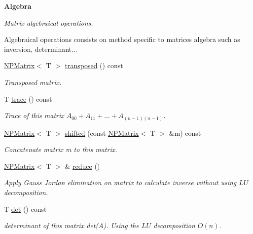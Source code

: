 \begin{Indent}\textbf{ Algebra}\par
{\em Matrix algebraical operations.

Algebraical operations consists on method specific to matrices algebra such as inversion, determinant... }\begin{DoxyCompactItemize}
\item 
\mbox{\hyperlink{class_n_p_matrix}{N\+P\+Matrix}}$<$ T $>$ \mbox{\hyperlink{class_n_p_matrix_abb4f410d97dc7e89798c67112c1e1bd3}{transposed}} () const
\begin{DoxyCompactList}\small\item\em Transposed matrix. \end{DoxyCompactList}\item 
T \mbox{\hyperlink{class_n_p_matrix_a007a87743223b6dddaa3ec8e44489ffb}{trace}} () const
\begin{DoxyCompactList}\small\item\em Trace of this matrix $ A_{00} + A_{11} + ... + A_{(n-1)(n-1)} $. \end{DoxyCompactList}\item 
\mbox{\hyperlink{class_n_p_matrix}{N\+P\+Matrix}}$<$ T $>$ \mbox{\hyperlink{class_n_p_matrix_ac46001932fe08670105f2b51dc72c32b}{shifted}} (const \mbox{\hyperlink{class_n_p_matrix}{N\+P\+Matrix}}$<$ T $>$ \&m) const
\begin{DoxyCompactList}\small\item\em Concatenate matrix {\ttfamily m} to {\ttfamily this} matrix. \end{DoxyCompactList}\item 
\mbox{\hyperlink{class_n_p_matrix}{N\+P\+Matrix}}$<$ T $>$ \& \mbox{\hyperlink{class_n_p_matrix_ae9789161bbe6c4dc9be0bd8908313a29}{reduce}} ()
\begin{DoxyCompactList}\small\item\em Apply Gauss Jordan elimination on matrix to calculate inverse without using $ LU $ decomposition. \end{DoxyCompactList}\item 
T \mbox{\hyperlink{class_n_p_matrix_afea28129e85911922957e9013d81e79a}{det}} () const
\begin{DoxyCompactList}\small\item\em determinant of this matrix det(\+A). Using the $ LU $ decomposition $ O(n) $. \end{DoxyCompactList}\end{DoxyCompactItemize}
\end{Indent}
